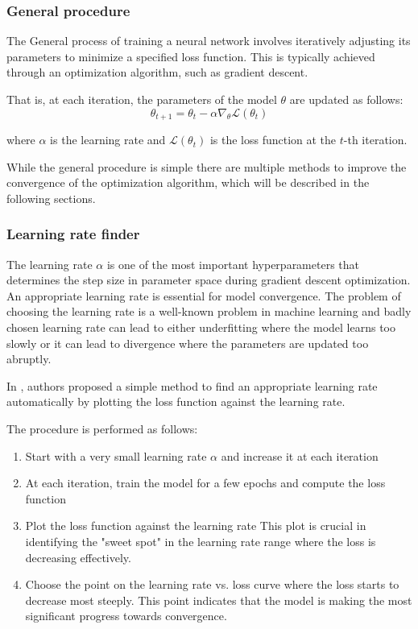 \documentclass[a4paper, twoside]{report}
\theoremstyle{definition}
\numberwithin{equation}{section}
\begin{document}
\subsubsection{General procedure}

The General process of training a neural network involves iteratively adjusting its
parameters to minimize a specified loss function.
This is typically achieved through an optimization algorithm, such as gradient descent.

That is, at each iteration, the parameters of the model $\theta$ are updated as follows:
\begin{equation} \label{eq:gradient_descent}
    \theta_{t+1}=\theta_t - \alpha \nabla_{\theta} \mathcal{L}(\theta_t)
\end{equation}

where $\alpha$ is the learning rate and $\mathcal{L}(\theta_t)$ is the loss function at the $t$-th iteration.

While the general procedure is simple there are multiple methods to improve the convergence of the optimization algorithm,
which will be described in the following sections.


\subsubsection{Learning rate finder} \label{sec:learning_rate_finder}
The learning rate $\alpha$ is one of the most important hyperparameters that determines the step size in parameter space
during gradient descent optimization. An appropriate learning rate is essential for
model convergence.
The problem of choosing the learning rate is a well-known problem in machine learning
and badly chosen learning rate can lead to either underfitting where the model
learns too slowly or it can lead to divergence where the parameters are updated too abruptly.

In \cite{1506.01186}, authors proposed a simple method to find an appropriate learning rate
automatically by plotting the loss function against the learning rate.

The procedure is performed as follows:
\begin{enumerate}
    \item Start with a very small learning rate $\alpha$ and increase it at each iteration
    \item At each iteration, train the model for a few epochs and compute the loss function
    \item Plot the loss function against the learning rate
          This plot is crucial in identifying the "sweet spot" in the learning rate range
          where the loss is decreasing effectively.
    \item Choose the point on the learning rate vs. loss curve where the
          loss starts to decrease most steeply.  This point indicates that the model
          is making the most significant progress towards convergence.
\end{enumerate}
\end{document}
